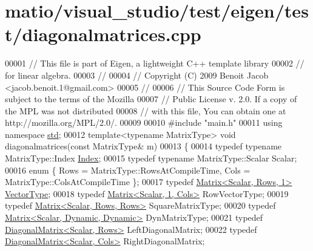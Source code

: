 \hypertarget{matio_2visual__studio_2test_2eigen_2test_2diagonalmatrices_8cpp_source}{}\section{matio/visual\+\_\+studio/test/eigen/test/diagonalmatrices.cpp}
\label{matio_2visual__studio_2test_2eigen_2test_2diagonalmatrices_8cpp_source}

\begin{DoxyCode}
00001 \textcolor{comment}{// This file is part of Eigen, a lightweight C++ template library}
00002 \textcolor{comment}{// for linear algebra.}
00003 \textcolor{comment}{//}
00004 \textcolor{comment}{// Copyright (C) 2009 Benoit Jacob <jacob.benoit.1@gmail.com>}
00005 \textcolor{comment}{//}
00006 \textcolor{comment}{// This Source Code Form is subject to the terms of the Mozilla}
00007 \textcolor{comment}{// Public License v. 2.0. If a copy of the MPL was not distributed}
00008 \textcolor{comment}{// with this file, You can obtain one at http://mozilla.org/MPL/2.0/.}
00009 
00010 \textcolor{preprocessor}{#include "main.h"}
00011 \textcolor{keyword}{using namespace }\hyperlink{namespacestd}{std};
00012 \textcolor{keyword}{template}<\textcolor{keyword}{typename} MatrixType> \textcolor{keywordtype}{void} diagonalmatrices(\textcolor{keyword}{const} MatrixType& m)
00013 \{
00014   \textcolor{keyword}{typedef} \textcolor{keyword}{typename} MatrixType::Index \hyperlink{namespace_eigen_a62e77e0933482dafde8fe197d9a2cfde}{Index};
00015   \textcolor{keyword}{typedef} \textcolor{keyword}{typename} MatrixType::Scalar Scalar;
00016   \textcolor{keyword}{enum} \{ Rows = MatrixType::RowsAtCompileTime, Cols = MatrixType::ColsAtCompileTime \};
00017   \textcolor{keyword}{typedef} \hyperlink{group___core___module_class_eigen_1_1_matrix}{Matrix<Scalar, Rows, 1>} \hyperlink{struct_vector_type}{VectorType};
00018   \textcolor{keyword}{typedef} \hyperlink{group___core___module_class_eigen_1_1_matrix}{Matrix<Scalar, 1, Cols>} RowVectorType;
00019   \textcolor{keyword}{typedef} \hyperlink{group___core___module_class_eigen_1_1_matrix}{Matrix<Scalar, Rows, Rows>} SquareMatrixType;
00020   \textcolor{keyword}{typedef} \hyperlink{group___core___module}{Matrix<Scalar, Dynamic, Dynamic>} DynMatrixType;
00021   \textcolor{keyword}{typedef} \hyperlink{group___core___module_class_eigen_1_1_diagonal_matrix}{DiagonalMatrix<Scalar, Rows>} LeftDiagonalMatrix;
00022   \textcolor{keyword}{typedef} \hyperlink{group___core___module_class_eigen_1_1_diagonal_matrix}{DiagonalMatrix<Scalar, Cols>} RightDiagonalMatrix;

\end{DoxyCode}
